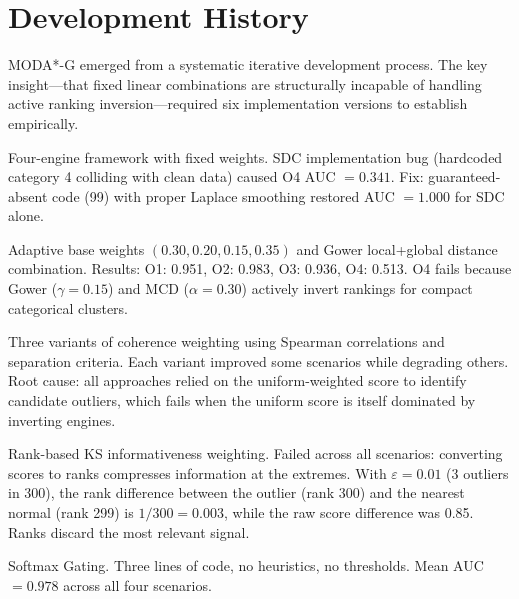 \documentclass[11pt]{article}
\theoremstyle{plain}
\theoremstyle{definition}
\begin{document}
\appendix
\section{Development History}
\label{app:versions}

MODA*-G emerged from a systematic iterative development
process. The key insight---that fixed linear combinations
are structurally incapable of handling active ranking
inversion---required six implementation versions to
establish empirically.

\begin{description}[leftmargin=*]
\item[\textbf{v0.1--v0.2}] Four-engine framework with
  fixed weights. SDC implementation bug (hardcoded
  category 4 colliding with clean data) caused
  O4 AUC $= 0.341$. Fix: guaranteed-absent code (99)
  with proper Laplace smoothing restored
  AUC $= 1.000$ for SDC alone.
\item[\textbf{v0.3}] Adaptive base weights
  $(0.30, 0.20, 0.15, 0.35)$ and Gower local+global
  distance combination. Results: O1: 0.951, O2: 0.983,
  O3: 0.936, O4: 0.513. O4 fails because Gower
  ($\gamma{=}0.15$) and MCD ($\alpha{=}0.30$) actively
  invert rankings for compact categorical clusters.
\item[\textbf{v0.4--v0.4c}] Three variants of coherence
  weighting using Spearman correlations and separation
  criteria. Each variant improved some scenarios while
  degrading others. Root cause: all approaches relied
  on the uniform-weighted score to identify candidate
  outliers, which fails when the uniform score is
  itself dominated by inverting engines.
\item[\textbf{v0.5}] Rank-based KS informativeness
  weighting. Failed across all scenarios: converting
  scores to ranks compresses information at the
  extremes. With $\varepsilon = 0.01$ (3 outliers in
  300), the rank difference between the outlier
  (rank 300) and the nearest normal (rank 299) is
  $1/300 = 0.003$, while the raw score difference was
  0.85. Ranks discard the most relevant signal.
\item[\textbf{v0.6 = MODA*-G}] Softmax Gating.
  Three lines of code, no heuristics, no thresholds.
  Mean AUC $= 0.978$ across all four scenarios.
\end{description}
\end{document}
